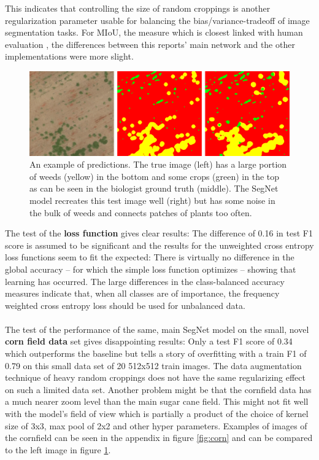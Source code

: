 \documentclass{article}
\begin{document}
This indicates that controlling the size of random croppings is another regularization parameter usable for balancing the bias/variance-tradeoff of image segmentation tasks. For MIoU, the measure which is closest linked with human evaluation \cite{eval}, the differences between this reports' main network and the other implementations were more slight. 
\begin{figure}[h!]
	\centering
	\includegraphics[width=\linewidth]{../../poster/reconst}
	\caption{An example of predictions. The true image (left) has a large portion of weeds (yellow) in the bottom and some crops (green) in the top as can be seen in the biologist ground truth (middle). The SegNet model recreates this test image well (right) but has some noise in the bulk of weeds and connects patches of plants too often. }
	\label{fig:reconst}
\end{figure}

\noindent
The test of the \textbf{loss function} gives clear results: The difference of 0.16 in test F1 score is assumed to be significant and the results for the unweighted cross entropy loss functions seem to fit the expected:
There is virtually no difference in the global accuracy -- for which the simple loss function optimizes -- showing that learning has occurred.
The large differences in the class-balanced accuracy measures indicate that, when all classes are of importance, the frequency weighted cross entropy loss should be used  for unbalanced data.
\\
\\
The test of the performance of the same, main SegNet model on the small, novel \textbf{corn field data} set gives disappointing results: Only a test F1 score of 0.34 which outperforms the baseline but tells a story of overfitting with a train F1 of 0.79 on this small data set of 20 512x512 train images.
 The data augmentation technique of heavy random croppings does not have the same regularizing effect on such a limited data set. 
Another problem might be that the cornfield data has a much nearer zoom level than the main sugar cane field.
This might not fit well with the model's field of view which is partially a product of the choice of kernel size of 3x3, max pool of 2x2 and other hyper parameters. Examples of images of the cornfield can be seen in the appendix in figure \ref{fig:corn} and can be compared to the left image in figure \ref{fig:reconst}.
\end{document}
